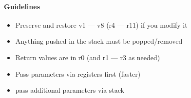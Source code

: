 \documentclass[12pt]{report}
\begin{document}
    \paragraph{Guidelines}
    \begin{itemize}
      \item Preserve and restore v1 --- v8 (r4 --- r11) if you modify it
      \item Anything pushed in the stack must be popped/removed
      \item Return values are in r0 (and r1 --- r3 as needed)
      \item Pass parameters via registers first (faster)
      \item pass additional parameters via stack
    \end{itemize}
\end{document}
